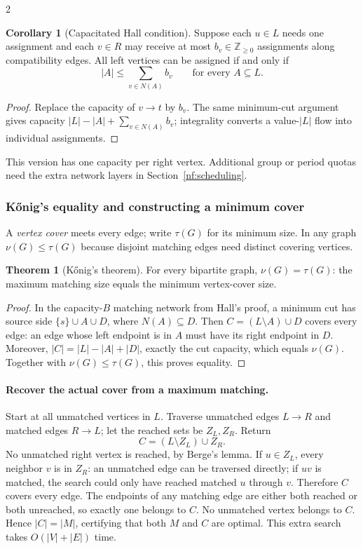 \documentclass[10pt]{article}
\theoremstyle{definition}
\newtheorem{theorem}[definition]{Theorem}
\newtheorem{corollary}[definition]{Corollary}
\begin{document}
\begin{multicols*}{2}
\begin{corollary}[Capacitated Hall condition]\label{nf:capacitated-hall}
Suppose each $u\in L$ needs one assignment and each $v\in R$ may receive
at most $b_v\in\mathbb Z_{\ge0}$ assignments along compatibility edges.
All left vertices can be assigned if and only if
\[
 |A|\le\sum_{v\in N(A)}b_v\qquad\text{for every }A\subseteq L.
\]
\end{corollary}
\begin{proof}
Replace the capacity of $v\to t$ by $b_v$. The same minimum-cut argument
gives capacity $|L|-|A|+\sum_{v\in N(A)}b_v$; integrality converts a
value-$|L|$ flow into individual assignments.
\end{proof}
This version has one capacity per right vertex. Additional group or period
quotas need the extra network layers in Section~\ref{nf:scheduling}.

\subsubsection*{K\H{o}nig's equality and constructing a minimum cover}
A \emph{vertex cover} meets every edge; write $\tau(G)$ for its minimum
size. In any graph $\nu(G)\le\tau(G)$ because disjoint matching edges
need distinct covering vertices.
\begin{theorem}[K\H{o}nig's theorem]\label{nf:konig}
For every bipartite graph, $\nu(G)=\tau(G)$: the maximum matching size
equals the minimum vertex-cover size.
\end{theorem}
\begin{proof}
In the capacity-$B$ matching network from Hall's proof, a minimum cut has
source side $\{s\}\cup A\cup D$, where $N(A)\subseteq D$.
Then $C=(L\setminus A)\cup D$ covers every edge: an edge whose left endpoint
is in $A$ must have its right endpoint in $D$. Moreover,
$|C|=|L|-|A|+|D|$, exactly the cut capacity, which equals $\nu(G)$.
Together with $\nu(G)\le\tau(G)$, this proves equality.
\end{proof}

\paragraph{Recover the actual cover from a maximum matching.}
Start at all unmatched vertices in $L$. Traverse unmatched edges $L\to R$
and matched edges $R\to L$; let the reached sets be $Z_L,Z_R$. Return
\[
 C=(L\setminus Z_L)\cup Z_R.
\]
No unmatched right vertex is reached, by Berge's lemma. If $u\in Z_L$,
every neighbor $v$ is in $Z_R$: an unmatched edge can be traversed directly;
if $uv$ is matched, the search could only have reached matched $u$ through
$v$. Therefore $C$ covers every edge. The endpoints of any matching edge
are either both reached or both unreached, so exactly one belongs to $C$.
No unmatched vertex belongs to $C$. Hence $|C|=|M|$, certifying that both
$M$ and $C$ are optimal. This extra search takes $O(|V|+|E|)$ time.


\end{multicols*}
\end{document}
